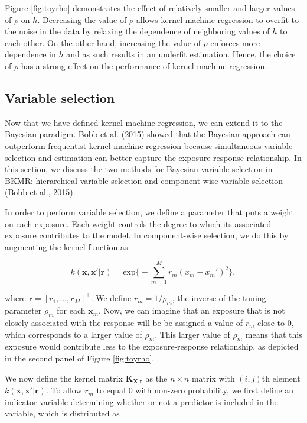 \documentclass[12pt, twoside]{amherstthesis}
\begin{document}
Figure \ref{fig:toyrho} demonstrates the effect of relatively smaller and larger values of \(\rho\) on \(h\). Decreasing the value of \(\rho\) allows kernel machine regression to overfit to the noise in the data by relaxing the dependence of neighboring values of \(h\) to each other. On the other hand, increasing the value of \(\rho\) enforces more dependence in \(h\) and as such results in an underfit estimation. Hence, the choice of \(\rho\) has a strong effect on the performance of kernel machine regression.

\hypertarget{variable-selection}{%
\subsection{Variable selection}\label{variable-selection}}

Now that we have defined kernel machine regression, we can extend it to the Bayesian paradigm. Bobb et al. (\protect\hyperlink{ref-bobb_bayesian_2015}{2015}) showed that the Bayesian approach can outperform frequentist kernel machine regression because simultaneous variable selection and estimation can better capture the exposure-response relationship. In this section, we discuss the two methods for Bayesian variable selection in BKMR: hierarchical variable selection and component-wise variable selection (\protect\hyperlink{ref-bobb_bayesian_2015}{Bobb et al., 2015}).

In order to perform variable selection, we define a parameter that puts a weight on each exposure. Each weight controls the degree to which its associated exposure contributes to the model. In component-wise selection, we do this by augmenting the kernel function as

\[
k(\textbf{x}, \textbf{x}'|\textbf{r}) = \text{exp}\bigg\{ -\sum_{m=1}^Mr_m(x_m-x_m')^2 \bigg\},
\]

\noindent where \(\textbf{r}=[r_1,\dots,r_M]^\top\). We define \(r_m=1/{\rho_m}\), the inverse of the tuning parameter \(\rho_m\) for each \(\textbf{x}_m\). Now, we can imagine that an exposure that is not closely associated with the response will be be assigned a value of \(r_m\) close to 0, which corresponds to a larger value of \(\rho_m\). This larger value of \(\rho_m\) means that this exposure would contribute less to the exposure-response relationship, as depicted in the second panel of Figure \ref{fig:toyrho}.

We now define the kernel matrix \(\textbf{K}_{\textbf{X},\textbf{r}}\) as the \(n\times n\) matrix with \((i,j)\)th element \(k(\textbf{x}, \textbf{x}'|\textbf{r})\). To allow \(r_m\) to equal 0 with non-zero probability, we first define an indicator variable determining whether or not a predictor is included in the variable, which is distributed as
\end{document}
